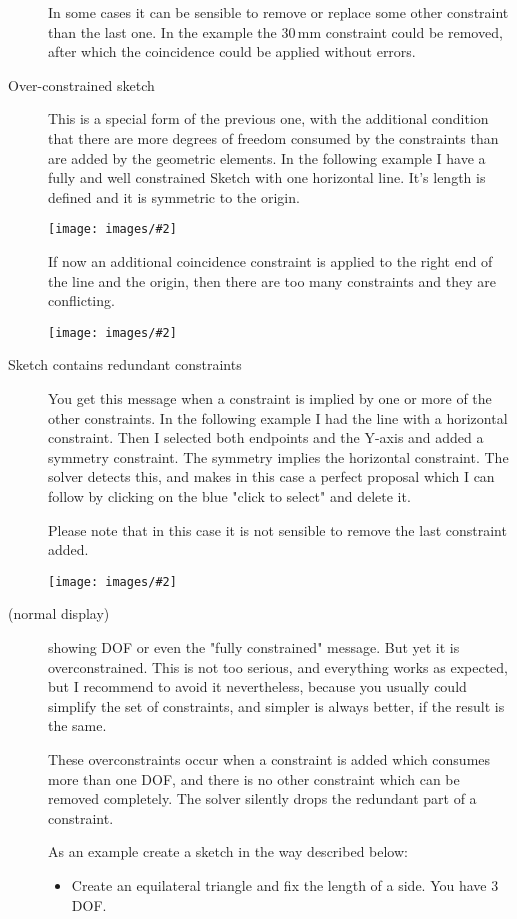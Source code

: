 \documentclass[12pt,titlepage]{article}
\newcommand{\img}[2]{\vspace{2ex}\noindent\texttt{[image: images/\#2]}}
\begin{document}
\begin{description}
	In some cases it can be sensible to remove or replace some other constraint than the last one. In the example the 30\,mm constraint could be removed, after which the coincidence could be applied without errors.
	
	\item [Over-constrained sketch] This is a special form of the previous one, with the additional condition that there are more degrees of freedom consumed by the constraints than are added by the geometric elements. In the following example I have a fully and well constrained Sketch with one horizontal line. It's length is defined and it is symmetric to the origin.
	
	\img{}{ConstraintsSolverOver1}
	
	If now an additional coincidence constraint is applied to the right end of the line and the origin, then there are too many constraints and they are conflicting.
	
	\img{}{ConstraintsSolverOver2}
	
	
	\item [Sketch contains redundant constraints]You get this message when a constraint is implied by one or more of the other constraints. In the following example I had the line with a horizontal constraint. Then I selected both endpoints and the Y-axis and added a symmetry constraint. The symmetry implies the horizontal constraint. The solver detects this, and makes in this case a perfect proposal which I can follow by clicking on the blue "click to select" and delete it.
	
	Please note that in this case it is not sensible to remove the last constraint added.
	
	\img{}{ConstraintsSolverRedundant}
	
	\item [(normal display)] showing DOF or even the "fully constrained" message. But yet it is over\-con\-strained. This is not too serious, and everything works as expected, but I recommend to avoid it nevertheless, because you usually could simplify the set of constraints, and simpler is always better, if the result is the same.
	
	These overconstraints occur when a constraint is added which consumes more than one DOF, and there is no other constraint which can be removed completely. The solver silently drops the redundant part of a constraint.
	
	As an example create a sketch in the way described below:
	
	\begin{itemize} \item Create an equilateral triangle and fix the length of a side. You have 3 DOF.
		

\end{itemize}
\end{description}
\end{document}
